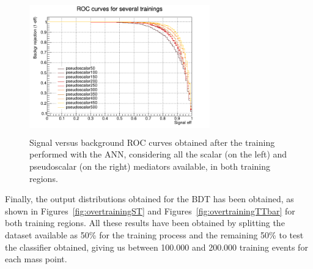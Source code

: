 \documentclass[a4paper, 10pt, openright]{report}
\begin{document}
\begin{figure}[htbp]
{\begin{minipage}[b]{.49\textwidth}
\includegraphics[width=7.8cm, height=5.8cm]{figs/groupedROC_pseudo_TTbar.png}
\end{minipage} \hfill
}
\caption{Signal versus background \ac{ROC} curves obtained after the training performed with the \ac{ANN}, considering all the scalar (on the left) and pseudoscalar (on the right) mediators available, in both training regions.}
\label{fig:ROC2}
\end{figure}

Finally, the output distributions obtained for the \ac{BDT} has been obtained, as shown in Figures~\ref{fig:overtrainingST} and Figures~\ref{fig:overtrainingTTbar} for both training regions. All these results have been obtained by splitting the dataset available as 50\% for the training process and the remaining 50\% to test the classifier obtained, giving us between 100.000 and 200.000 training events for each mass point.
\end{document}

